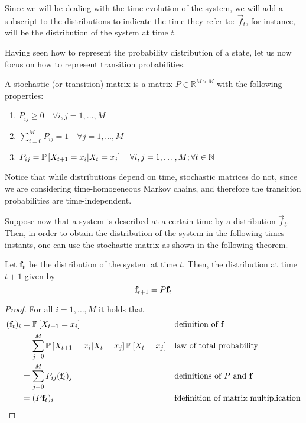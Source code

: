 Since we will be dealing with the time evolution of the system, we will add a subscript to the distributions to indicate the time they refer to: $\vec{f}_t$, for instance, will be the distribution of the system at time $t$.

Having seen how to represent the probability distribution of a state, let us now focus on how to represent transition probabilities.

\begin{ndef}  \label{def:stoc_matrix}
    A stochastic (or transition) matrix is a matrix $P \in \mathbb{R}^{M\times M}$ with the following properties:
    \begin{center}
        \begin{enumerate}
            \item $P_{ij} \geq 0 \quad \forall i,j = 1,\dots,M$
            \item $\sum_{i = 0}^M P_{ij} = 1 \quad \forall j = 1,\dots,M$
            \item $P_{ij} = \mathbb{P}\left[X_{t+1} = x_i | X_t = x_j \right] \quad \forall i,j = 1,\dots,M; \forall t\in \mathbb N$
        \end{enumerate}
    \end{center}
\end{ndef}

Notice that while distributions depend on time, stochastic matrices do not, since we are considering time-homogeneous Markov chains, and therefore the transition probabilities are time-independent.

\smallskip
Suppose now that a system is described at a certain time by a distribution $\vec{f}_t$. Then, in order to obtain the distribution of the system in the following times instants, one can use the stochastic matrix as shown in the following theorem.

\begin{theorem} \label{th:evolution_simple}
    Let $\mathbf{f}_t$ be the distribution of the system at time $t$. Then, the distribution at time $t + 1$ given by
    \begin{equation}
        \mathbf{f}_{t+1} = P \mathbf{f}_t
    \end{equation}
\end{theorem}
\begin{proof}
    For all $i = 1,\dots,M$ it holds that
    \begin{align}
        (\mathbf{f}_t)_i
         & = \mathbb{P}\left[X_{t+1} = x_i \right]                                           &  & \text{definition of $\mathbf{f}$}                                     \\
         & = \sum_{j = 0}^M \mathbb{P}\left[X_{t+1} = x_i | X_t = x_j\right] \mathbb{P}\left[X_t = x_j\right] &  & \text{law of total probability}                \\
         & = \sum_{j = 0}^M P_{ij} (\mathbf{f}_t)_j                                   &  & \text{definitions of $P$ and $\mathbf{f}$} \label{eq:matmul1}          \\
         & = (P \mathbf{f}_t)_i                                                       &  & \text{fdefinition of matrix multiplication} \label{eq:matmul2}
    \end{align}

\end{proof}

